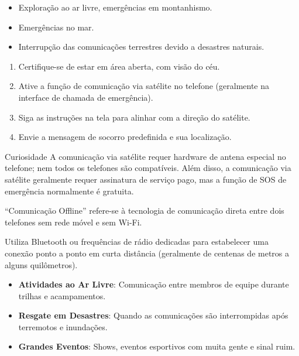 \begin{itemize}
  \item Exploração ao ar livre, emergências em montanhismo.
  \item Emergências no mar.
  \item Interrupção das comunicações terrestres devido a desastres naturais.
\end{itemize}


\begin{enumerate}
  \item Certifique-se de estar em área aberta, com visão do céu.
  \item Ative a função de comunicação via satélite no telefone (geralmente na interface de chamada de emergência).
  \item Siga as instruções na tela para alinhar com a direção do satélite.
  \item Envie a mensagem de socorro predefinida e sua localização.
\end{enumerate}

\begin{tcbinfo}{Curiosidade}
A comunicação via satélite requer hardware de antena especial no telefone; nem todos os telefones são compatíveis. Além disso, a comunicação via satélite geralmente requer assinatura de serviço pago, mas a função de SOS de emergência normalmente é gratuita.

\end{tcbinfo}


“Comunicação Offline” refere-se à tecnologia de comunicação direta entre dois telefones sem rede móvel e sem Wi-Fi.


Utiliza Bluetooth ou frequências de rádio dedicadas para estabelecer uma conexão ponto a ponto em curta distância (geralmente de centenas de metros a alguns quilômetros).


\begin{itemize}
  \item \textbf{Atividades ao Ar Livre}: Comunicação entre membros de equipe durante trilhas e acampamentos.
  \item \textbf{Resgate em Desastres}: Quando as comunicações são interrompidas após terremotos e inundações.
  \item \textbf{Grandes Eventos}: Shows, eventos esportivos com muita gente e sinal ruim.
\end{itemize}

